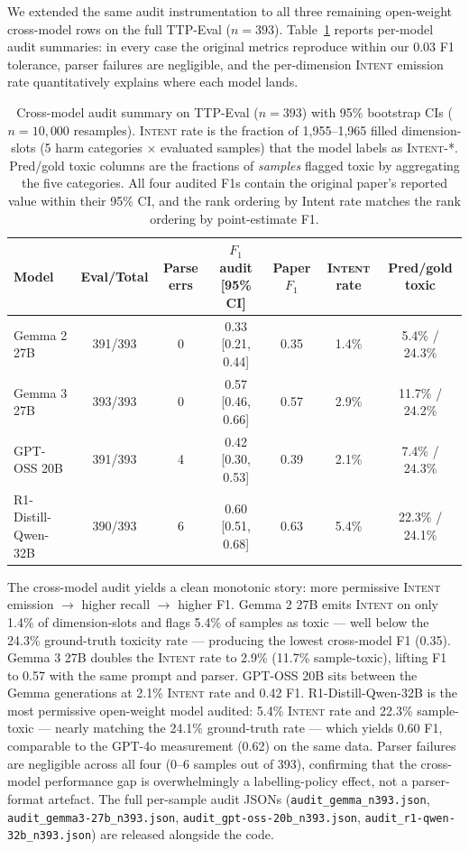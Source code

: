 \documentclass[10pt]{article} %
\begin{document}
We extended the same audit instrumentation to all three remaining open-weight cross-model rows on the full TTP-Eval ($n=393$). Table~\ref{tab:cross-model-audit} reports per-model audit summaries: in every case the original metrics reproduce within our 0.03 F1 tolerance, parser failures are negligible, and the per-dimension \textsc{Intent} emission rate quantitatively explains where each model lands.

\begin{table}[H]
\centering
\small
\setlength{\tabcolsep}{5pt}
\begin{tabular}{lcccccc}
\hline
Model & Eval/Total & Parse errs & $F_1$ audit [95\% CI] & Paper $F_1$ & \textsc{Intent} rate & Pred/gold toxic \\
\hline
Gemma 2 27B   & 391/393 & 0 & 0.33 [0.21, 0.44] & 0.35 & 1.4\% & 5.4\% / 24.3\% \\
Gemma 3 27B   & 393/393 & 0 & 0.57 [0.46, 0.66] & 0.57 & 2.9\% & 11.7\% / 24.2\% \\
GPT-OSS 20B   & 391/393 & 4 & 0.42 [0.30, 0.53] & 0.39 & 2.1\% & 7.4\% / 24.3\% \\
R1-Distill-Qwen-32B & 390/393 & 6 & 0.60 [0.51, 0.68] & 0.63 & 5.4\% & 22.3\% / 24.1\% \\
\hline
\end{tabular}
\caption{Cross-model audit summary on TTP-Eval ($n=393$) with 95\% bootstrap CIs ($n=10{,}000$ resamples). \textsc{Intent} rate is the fraction of 1{,}955--1{,}965 filled dimension-slots (5 harm categories $\times$ evaluated samples) that the model labels as \textsc{Intent-*}. Pred/gold toxic columns are the fractions of \emph{samples} flagged toxic by aggregating the five categories. All four audited F1s contain the original paper's reported value within their 95\% CI, and the rank ordering by Intent rate matches the rank ordering by point-estimate F1.}
\label{tab:cross-model-audit}
\end{table}

The cross-model audit yields a clean monotonic story: more permissive \textsc{Intent} emission $\to$ higher recall $\to$ higher F1. Gemma 2 27B emits \textsc{Intent} on only 1.4\% of dimension-slots and flags 5.4\% of samples as toxic --- well below the 24.3\% ground-truth toxicity rate --- producing the lowest cross-model F1 (0.35). Gemma 3 27B doubles the \textsc{Intent} rate to 2.9\% (11.7\% sample-toxic), lifting F1 to 0.57 with the same prompt and parser. GPT-OSS 20B sits between the Gemma generations at 2.1\% \textsc{Intent} rate and 0.42 F1. R1-Distill-Qwen-32B is the most permissive open-weight model audited: 5.4\% \textsc{Intent} rate and 22.3\% sample-toxic --- nearly matching the 24.1\% ground-truth rate --- which yields 0.60 F1, comparable to the GPT-4o measurement (0.62) on the same data. Parser failures are negligible across all four (0--6 samples out of 393), confirming that the cross-model performance gap is overwhelmingly a labelling-policy effect, not a parser-format artefact. The full per-sample audit JSONs (\texttt{audit\_gemma\_n393.json}, \texttt{audit\_gemma3-27b\_n393.json}, \texttt{audit\_gpt-oss-20b\_n393.json}, \texttt{audit\_r1-qwen-32b\_n393.json}) are released alongside the code.
\end{document}
